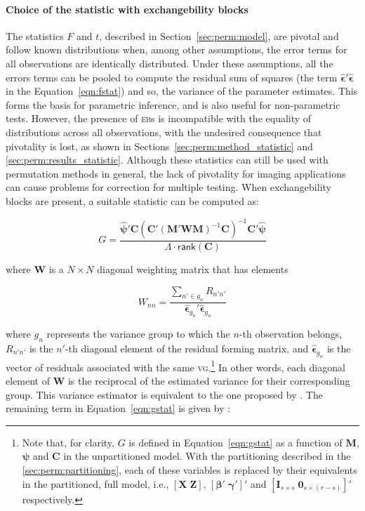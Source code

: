 \paragraph{Choice of the statistic with exchangebility blocks} The statistics $F$ and $t$, described in Section~\ref{sec:perm:model}, are pivotal and follow known distributions when, among other assumptions, the error terms for all observations are identically distributed. Under these assumptions, all the errors terms can be pooled to compute the residual sum of squares (the term $\boldsymbol{\hat{\epsilon}}'\boldsymbol{\hat{\epsilon}}$ in the Equation~\ref{eqn:fstat}) and so, the variance of the parameter estimates. This forms the basis for parametric inference, and is also useful for non-parametric tests. However, the presence of \textsc{eb}s is incompatible with the equality of distributions across all observations, with the undesired consequence that pivotality is lost, as shown in Sections~\ref{sec:perm:method_statistic} and \ref{sec:perm:results_statistic}. Although these statistics can still be used with permutation methods in general, the lack of pivotality for imaging applications can cause problems for correction for multiple testing. When exchangebility blocks are present, a suitable statistic can be computed as:

\begin{equation}
G = \dfrac{\boldsymbol{\hat{\psi}}'\mathbf{C} \left(\mathbf{C}'(\mathbf{M}'\mathbf{W}\mathbf{M})^{-1}\mathbf{C} \right)^{-1} \mathbf{C}'\boldsymbol{\hat{\psi}}}{\Lambda \cdot \mathsf{rank}\left(\mathbf{C}\right)}
\label{eqn:gstat}
\end{equation}

\noindent
where $\mathbf{W}$ is a $N \times N$ diagonal weighting matrix that has elements

\begin{equation}
W_{nn} = \dfrac{\sum_{n' \in g_{n}}R_{n'n'}}{\boldsymbol{\hat{\epsilon}}_{g_{n}}'\boldsymbol{\hat{\epsilon}}_{g_{n}}}
\end{equation}

\noindent where $g_{n}$ represents the variance group to which the $n$-th observation belongs, $R_{n'n'}$ is the $n'$-th diagonal element of the residual forming matrix, and $\boldsymbol{\hat{\epsilon}}_{g_{n}}$ is the vector of residuals associated with the same \textsc{vg}.\footnote{Note that, for clarity, $G$ is defined in Equation~\ref{eqn:gstat} as a function of $\mathbf{M}$, $\boldsymbol{\psi}$ and $\mathbf{C}$ in the unpartitioned model. With the partitioning described in the \ref{sec:perm:partitioning}, each of these variables is replaced by their equivalents in the partitioned, full model, i.e., $[\mathbf{X} \; \mathbf{Z}]$, $[\boldsymbol{\beta}' \; \boldsymbol{\gamma}']'$ and $[\mathbf{I}_{s \times s}\;\mathbf{0}_{s \times (r-s)}]'$ respectively.} In other words, each diagonal element of $\mathbf{W}$ is the reciprocal of the estimated variance for their corresponding group. This variance estimator is equivalent to the one proposed by \citet{Horn1975}. The remaining term in Equation~\ref{eqn:gstat} is given by \citep{Welch1951}:

